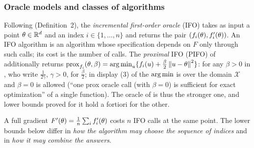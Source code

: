 \subsubsection{Oracle models and classes of algorithms}

\begin{definition}
\label{def:ifo}
Following \cite{agarwal2015lower} (Definition~2), the \emph{incremental first-order oracle} (IFO) takes as input a point $\theta\in\mathbb{R}^d$ and an index $i\in\{1,\dots,n\}$ and returns the pair $(f_i(\theta),f'_i(\theta))$. An IFO algorithm is an algorithm whose specification depends on $F$ only through such calls; its cost is the number of calls. The \emph{proximal} IFO (PIFO) of \cite{woodworth2016tight,han2024lower} additionally returns $\operatorname{prox}_{f_i}(\theta,\beta)=\operatorname*{arg\,min}_u\{f_i(u)+\frac\beta2\left\|u-\theta\right\|^2\}$: for any $\beta>0$ in \cite{han2024lower}, who write $\frac1{2\gamma}$, $\gamma>0$, for $\frac\beta2$; in display (3) of \cite{woodworth2016tight} the $\operatorname*{arg\,min}$ is over the domain $\mathcal X$ and $\beta=0$ is allowed (``one prox oracle call (with $\beta=0$) is sufficient for exact optimization'' of a single function). The oracle of \cite{woodworth2016tight} is thus the stronger one, and lower bounds proved for it hold a fortiori for the other.
\end{definition}

A full gradient $F'(\theta)=\frac1n\sum_if'_i(\theta)$ costs $n$ IFO calls at the same point. The lower bounds below differ in \emph{how the algorithm may choose the sequence of indices} and in \emph{how it may combine the answers}.

